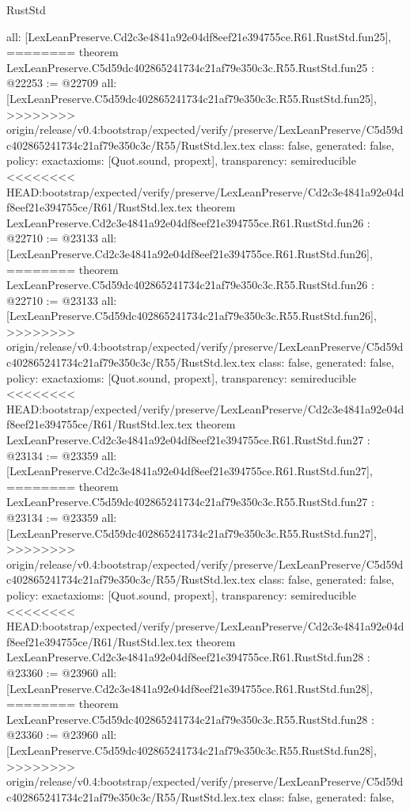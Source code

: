 \begin{lexlean}{RustStd}
\begin{coremodule}
{\begin{coremodule}
{{{{{{{{{{{{{{{{{{{{{{{{{{{{  all: [LexLeanPreserve.Cd2c3e4841a92e04df8eef21e394755ce.R61.RustStd.fun25],
========
theorem LexLeanPreserve.C5d59dc402865241734c21af79e350c3c.R55.RustStd.fun25 : @22253 := @22709 {
  all: [LexLeanPreserve.C5d59dc402865241734c21af79e350c3c.R55.RustStd.fun25],
>>>>>>>> origin/release/v0.4:bootstrap/expected/verify/preserve/LexLeanPreserve/C5d59dc402865241734c21af79e350c3c/R55/RustStd.lex.tex
  class: false,
  generated: false,
  policy: exact{axioms: [Quot.sound, propext]},
  transparency: semireducible
}
<<<<<<<< HEAD:bootstrap/expected/verify/preserve/LexLeanPreserve/Cd2c3e4841a92e04df8eef21e394755ce/R61/RustStd.lex.tex
theorem LexLeanPreserve.Cd2c3e4841a92e04df8eef21e394755ce.R61.RustStd.fun26 : @22710 := @23133 {
  all: [LexLeanPreserve.Cd2c3e4841a92e04df8eef21e394755ce.R61.RustStd.fun26],
========
theorem LexLeanPreserve.C5d59dc402865241734c21af79e350c3c.R55.RustStd.fun26 : @22710 := @23133 {
  all: [LexLeanPreserve.C5d59dc402865241734c21af79e350c3c.R55.RustStd.fun26],
>>>>>>>> origin/release/v0.4:bootstrap/expected/verify/preserve/LexLeanPreserve/C5d59dc402865241734c21af79e350c3c/R55/RustStd.lex.tex
  class: false,
  generated: false,
  policy: exact{axioms: [Quot.sound, propext]},
  transparency: semireducible
}
<<<<<<<< HEAD:bootstrap/expected/verify/preserve/LexLeanPreserve/Cd2c3e4841a92e04df8eef21e394755ce/R61/RustStd.lex.tex
theorem LexLeanPreserve.Cd2c3e4841a92e04df8eef21e394755ce.R61.RustStd.fun27 : @23134 := @23359 {
  all: [LexLeanPreserve.Cd2c3e4841a92e04df8eef21e394755ce.R61.RustStd.fun27],
========
theorem LexLeanPreserve.C5d59dc402865241734c21af79e350c3c.R55.RustStd.fun27 : @23134 := @23359 {
  all: [LexLeanPreserve.C5d59dc402865241734c21af79e350c3c.R55.RustStd.fun27],
>>>>>>>> origin/release/v0.4:bootstrap/expected/verify/preserve/LexLeanPreserve/C5d59dc402865241734c21af79e350c3c/R55/RustStd.lex.tex
  class: false,
  generated: false,
  policy: exact{axioms: [Quot.sound, propext]},
  transparency: semireducible
}
<<<<<<<< HEAD:bootstrap/expected/verify/preserve/LexLeanPreserve/Cd2c3e4841a92e04df8eef21e394755ce/R61/RustStd.lex.tex
theorem LexLeanPreserve.Cd2c3e4841a92e04df8eef21e394755ce.R61.RustStd.fun28 : @23360 := @23960 {
  all: [LexLeanPreserve.Cd2c3e4841a92e04df8eef21e394755ce.R61.RustStd.fun28],
========
theorem LexLeanPreserve.C5d59dc402865241734c21af79e350c3c.R55.RustStd.fun28 : @23360 := @23960 {
  all: [LexLeanPreserve.C5d59dc402865241734c21af79e350c3c.R55.RustStd.fun28],
>>>>>>>> origin/release/v0.4:bootstrap/expected/verify/preserve/LexLeanPreserve/C5d59dc402865241734c21af79e350c3c/R55/RustStd.lex.tex
  class: false,
  generated: false,
}}}}}}}}}}}}}}}}}}}}}}}}}}}}}}}}
\end{coremodule}}
\end{coremodule}
\end{lexlean}
